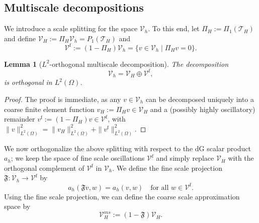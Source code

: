 \documentclass[10pt]{article}
\numberwithin{equation}{section}
\theoremstyle{plain}
\newtheorem{lemma}[theorem]{Lemma}
\theoremstyle{definition}
\theoremstyle{remark}
\begin{document}
\subsection{Multiscale decompositions}
We introduce a scale splitting for the space ${\mathcal{V}_h}$. To this end, let ${\Pi_H}:=\Pi_1({\mathcal{T}}_H)$ and define ${\mathcal{V}_H}:={\Pi_H}{\mathcal{V}_h}=P_1({\mathcal{T}}_H)$ and
\begin{equation*}
{\mathcal{V}^{\operatorname*{f}}}:=(1-{\Pi_H}){\mathcal{V}_h}=\{v\in{\mathcal{V}_h}\;\vert\;{\Pi_H} v= 0\}.
\end{equation*}
\begin{lemma}[$L^2$-orthogonal multiscale decomposition]\label{l:odl2}
The decomposition
$${\mathcal{V}_h}={\mathcal{V}_H}\oplus {\mathcal{V}^{\operatorname*{f}}},$$
is orthogonal in $L^2(\Omega)$.
\end{lemma}
\begin{proof}
The proof is immediate, as any $v\in{\mathcal{V}_h}$ can be
decomposed uniquely into a coarse finite element function $v_H:={\Pi_H} v\in {\mathcal{V}_H}$ and a (possibly highly oscillatory) remainder $v^{\operatorname*{f}}:=(1-{\Pi_H})v\in {\mathcal{V}^{\operatorname*{f}}}$, with $\|v\|_{L^2(\Omega)}^2=\|v_H\|_{L^2(\Omega)}^2+\|v^{\operatorname*{f}}\|_{L^2(\Omega)}^2$.
\end{proof}
We now orthogonalize the above splitting with respect to the dG scalar product $a_h$; we keep 
the space of fine scale oscillations ${\mathcal{V}^{\operatorname*{f}}}$ and simply replace ${\mathcal{V}_H}$ with the orthogonal complement of ${\mathcal{V}^{\operatorname*{f}}}$ in ${\mathcal{V}_h}$. We define the fine scale projection ${\mathfrak{F}}:{\mathcal{V}_h}\rightarrow {\mathcal{V}^{\operatorname*{f}}}$ by 
\begin{equation}\label{eq:multiscale-map}
  a_h({\mathfrak{F}} v,w) = a_h(v,w)\quad \text{for all }w\in{\mathcal{V}^{\operatorname*{f}}}.
\end{equation}
Using the fine scale projection, we can define the coarse scale approximation space by
\begin{equation*}
 {\mathcal{V}^{ms}_{H}}:= (1-{\mathfrak{F}}){\mathcal{V}_H}.
\end{equation*}
\end{document}
